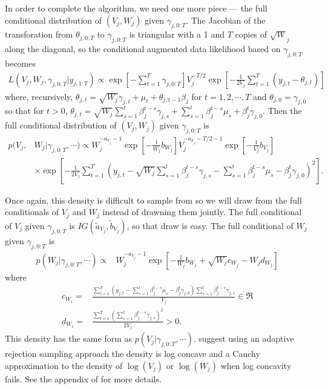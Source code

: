 \documentclass[graybox]{svmult}
\begin{document}
In order to complete the algorithm, we need one more piece --- the full conditional distribution of $(V_j,W_j)$ given $\gamma_{j,0:T}$. The Jacobian of the transforation from $\theta_{j,0:T}$ to $\gamma_{j,0:T}$ is triangular with a 1 and $T$ copies of $\sqrt{W}_j$ along the diagonal, so the conditional augmented data likelihood based on $\gamma_{j,0:T}$ becomes
\begin{align*}
L(V_j,W_j,\gamma_{j,0:T}|y_{j,1:T}) \propto \exp\left[-\sum_{t=1}^T\gamma_{j,0:T}\right] V_j^{-T/2}\exp\left[-\frac{1}{2V_j}\sum_{t=1}^T(y_{j,t} - \theta_{j,t})\right]
\end{align*}
where, recursively, $\theta_{j,t} =\sqrt{W_j}\gamma_{j,t} + \mu_t + \theta_{j,t-1}\beta_j$ for $t=1,2,\cdots,T$ and $\theta_{j,0}=\gamma_{j,0}$ so that for $t>0$, $\theta_{j,t} = \sqrt{W_j}\sum_{s=1}^t\beta_j^{t-s}\gamma_{j,s} + \sum_{s=1}^t\beta_j^{t-s}\mu_s + \beta_j^t\gamma_{j,0}$. Then the full conditional distribution of $(V_j,W_j)$ given $\gamma_{j,0:T}$ is
\begin{align*}
p(V_j,&W_j|\gamma_{j,0:T},\cdots) \propto W_j^{-a_{V_j}-1}\exp\left[-\frac{1}{W_j}b_{W_j}\right]V_j^{-a_{V_j}-T/2-1}\exp\left[-\frac{1}{V_j}b_{V_j}\right]\\
&\times\exp\left[-\frac{1}{2V_j}\sum_{t=1}^T\left(y_{j,t} - \sqrt{W_j}\sum_{s=1}^t\beta_j^{t-s}\gamma_{j,s} -\sum_{s=1}^t\beta_j^{t-s}\mu_s - \beta_j^t\gamma_{j,0}\right)^2\right].
\end{align*} 

Once again, this density is difficult to sample from so we will draw from the full conditionals of $V_j$ and $W_j$ instead of drawning them jointly. The full conditional of $V_j$ given $\gamma_{j,0:T}$ is $IG(\tilde{a}_{V_j},\tilde{b}_{V_j})$, so that draw is easy. The full conditional of $W_j$ given $\gamma_{j,0:T}$ is
\begin{align*}
p(W_j|\gamma_{j,0:T},\cdots)\propto&W_j^{-a_{V_j}-1}\exp\left[-\frac{1}{W_j}b_{W_j} + \sqrt{W_j}c_{W_j} - W_jd_{W_j}\right]
\end{align*}
where
\begin{align*}
c_{W_i}=&\frac{\sum_{t=1}^T\left(y_{j,t} - \sum_{s=1}^t\beta_j^{t-s}\mu_s - \beta_j^t\gamma_{j,0}\right)\sum_{s=1}^t\beta_j^{t-s}\gamma_{j,s}}{V_j}\in \Re\\
d_{W_i}=&\frac{\sum_{t=1}^T\left(\sum_{s=1}^t\beta_j^{t-s}\gamma_{j,s}\right)^2}{2V_j}>0.
\end{align*}
This density has the same form as $p(V_j|\gamma_{j,0:T},\cdots)$. \citet{simpson2014interweaving} suggest using an adaptive rejection sampling \citep{gilks1992adaptive} approach the density is log concave and a Cauchy approximation to the density of $\log(V_j)$ or $\log(W_j)$ when log concavity fails. See the appendix of \citet{simpson2014interweaving} for more details.
\clearpage


\end{document}
